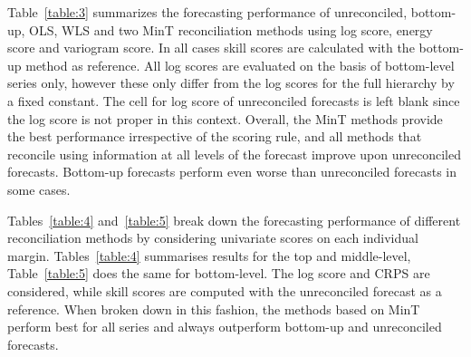 \documentclass[12pt]{article}
\theoremstyle{definition}
\begin{document}
Table~\ref{table:3} summarizes the forecasting performance of unreconciled, bottom-up, OLS, WLS and two MinT reconciliation methods using log score, energy score and variogram score. In all cases skill scores are calculated with the bottom-up method as reference. All log scores are evaluated on the basis of bottom-level series only, however these only differ from the log scores for the full hierarchy by a fixed constant. The cell for log score of unreconciled forecasts is left blank since the log score is not proper in this context. Overall, the MinT methods provide the best performance irrespective of the scoring rule, and all methods that reconcile using information at all levels of the forecast improve upon unreconciled forecasts. Bottom-up forecasts perform even worse than unreconciled forecasts in some cases.

Tables~\ref{table:4} and~\ref{table:5} break down the forecasting performance of different reconciliation methods by considering univariate scores on each individual margin.  Tables~\ref{table:4} summarises results for the top and middle-level, Table~\ref{table:5} does the same for bottom-level. The log score and CRPS are considered, while skill scores are computed with the unreconciled forecast as a reference. When broken down in this fashion, the methods based on MinT perform best for all series and always outperform bottom-up and unreconciled forecasts.
\end{document}
